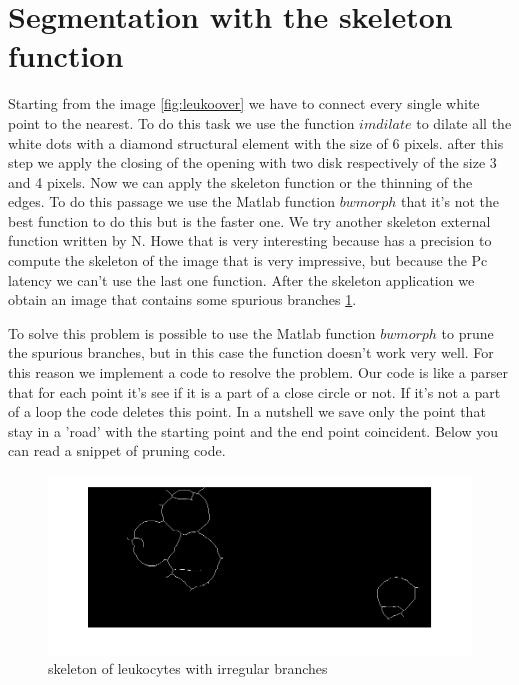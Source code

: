 \section{Segmentation with the skeleton function}
Starting from the image \ref{fig:leukoover} we have to connect every single white point to the nearest. To do this task we use the function $imdilate$ to dilate all the white dots with a diamond structural element with the size of 6 pixels. after this step we apply the closing of the opening with two disk respectively of the size 3 and 4 pixels. Now we can apply the skeleton function or the thinning of the edges. To do this passage we use the Matlab function $bwmorph$ that it's not the best function to do this but is the faster one. We try another skeleton external function written by N. Howe that is very interesting because has a precision to compute the skeleton of the image that is very impressive, but because the Pc latency we can't use the last one function. After the skeleton application we obtain an image that contains some spurious branches \ref{fig:skel}. 

\bigskip

To solve this problem is possible to use the Matlab function $bwmorph$ to prune the spurious branches, but in this case the function doesn’t work very well. For this reason we implement a code to resolve the problem. Our code is like a parser that for each point it's see if it is a part of a close circle or not. If it's not a part of a loop the code deletes this point. In a nutshell we save only the point that stay in a 'road' with the starting point and the end point coincident. Below you can read a snippet of pruning code.
\begin{figure}
	\begin{center}
		\centering
		\includegraphics[scale=0.5]{img/skel.png}
		\caption{skeleton of leukocytes with irregular branches}
		\label{fig:skel}
	\end{center}
\end{figure}

